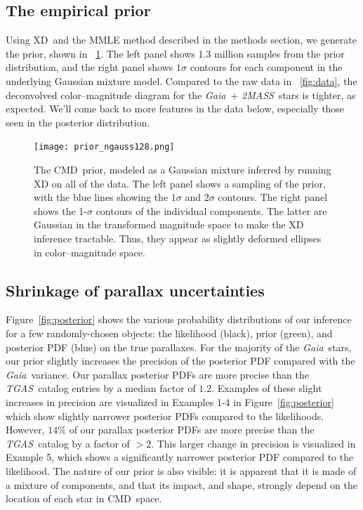 \documentclass[modern]{aastex61}
\newcommand{\acronym}[1]{{\small{#1}}}
\newcommand{\project}[1]{\textsl{#1}}
\newcommand{\tgas}{\project{\acronym{TGAS}}}
\newcommand{\tmass}{\project{\acronym{2MASS}}}
\newcommand{\gaia}{\project{Gaia}}
\newcommand{\xd}{\acronym{XD}}
\newcommand{\cmd}{\acronym{CMD}}
\begin{document}
\subsection{The empirical prior}
Using \xd\ and the MMLE method described in the methods section, we generate the
prior, shown in \figurename~\ref{fig:prior}.
The left panel shows 1.3 million samples from the prior distribution, and the
right panel shows $1\sigma$ contours for each component in the underlying
Gaussian mixture model.
Compared to the raw data in \figurename~\ref{fig:data}, the deconvolved
color--magnitude diagram for the \gaia\ + \tmass\ stars is tighter, as expected.
We'll come back to more features in the data below, especially those seen in the posterior distribution.
\begin{figure}
\centering
  \texttt{[image: prior\_ngauss128.png]}
\caption{The \cmd\ prior, modeled as a Gaussian mixture inferred by
  running XD on all of the data. The left panel shows a sampling of
  the prior, with the blue lines showing the $1\sigma$ and $2\sigma$
  contours. The right panel shows the 1-$\sigma$ contours of the
  individual components. The latter are Gaussian in the transformed
  magnitude space to make the XD inference tractable. Thus, they
  appear as slightly deformed ellipses in color--magnitude space.}
\label{fig:prior}
\end{figure}

\subsection{Shrinkage of parallax uncertainties}

Figure~\ref{fig:posterior} shows the various probability distributions of our inference for a few randomly-chosen objects: the likelihood (black), prior (green), and posterior PDF (blue) on the true parallaxes.
For the majority of the \gaia\ stars, our prior slightly increases the precision of the posterior PDF compared with the \gaia\ variance. Our parallax posterior PDFs are more precise than the \tgas\ catalog entries by a median factor of $1.2$. Examples of these slight increases in precision are visualized in Examples 1-4 in Figure~\ref{fig:posterior} which show slightly narrower posterior PDFs compared to the likelihoods.
However, $14\%$ of our parallax posterior PDFs are more precise than the \tgas\ catalog by a factor of $>2$. This larger change in precision is visualized in Example 5, which shows a significantly narrower posterior PDF compared to the likelihood.
The nature of our prior is also visible: it is apparent that it is made of a mixture of components, and that its impact, and shape, strongly depend on the location of each star in \cmd\ space.
\end{document}
